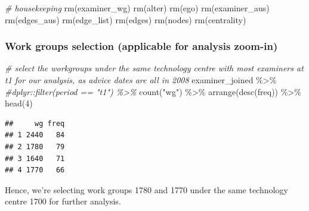 \documentclass[
]{article}
\newenvironment{Shaded}{\begin{snugshade}}{\end{snugshade}}
\newcommand{\CommentTok}[1]{\textcolor[rgb]{0.56,0.35,0.01}{\textit{#1}}}
\newcommand{\DecValTok}[1]{\textcolor[rgb]{0.00,0.00,0.81}{#1}}
\newcommand{\FunctionTok}[1]{\textcolor[rgb]{0.00,0.00,0.00}{#1}}
\newcommand{\NormalTok}[1]{#1}
\newcommand{\OtherTok}[1]{\textcolor[rgb]{0.56,0.35,0.01}{#1}}
\newcommand{\SpecialCharTok}[1]{\textcolor[rgb]{0.00,0.00,0.00}{#1}}
\newcommand{\StringTok}[1]{\textcolor[rgb]{0.31,0.60,0.02}{#1}}
\begin{document}
\begin{Shaded}
\begin{Highlighting}[]
\CommentTok{\# housekeeping}
\FunctionTok{rm}\NormalTok{(examiner\_wg)}
\FunctionTok{rm}\NormalTok{(alter)}
\FunctionTok{rm}\NormalTok{(ego)}
\FunctionTok{rm}\NormalTok{(examiner\_aus)}
\FunctionTok{rm}\NormalTok{(edges\_aus)}
\FunctionTok{rm}\NormalTok{(edge\_list)}
\FunctionTok{rm}\NormalTok{(edges)}
\FunctionTok{rm}\NormalTok{(nodes)}
\FunctionTok{rm}\NormalTok{(centrality)}
\end{Highlighting}
\end{Shaded}

\hypertarget{work-groups-selection-applicable-for-analysis-zoom-in}{%
\subsubsection{Work groups selection (applicable for analysis
zoom-in)}\label{work-groups-selection-applicable-for-analysis-zoom-in}}

\begin{Shaded}
\begin{Highlighting}[]
\CommentTok{\# select the workgroups under the same technology centre with most examiners at t1 for our analysis, as advice dates are all in 2008}
\NormalTok{examiner\_joined }\SpecialCharTok{\%\textgreater{}\%} 
  \CommentTok{\#dplyr::filter(period == "t1") \%\textgreater{}\% }
  \FunctionTok{count}\NormalTok{(}\StringTok{"wg"}\NormalTok{) }\SpecialCharTok{\%\textgreater{}\%} 
  \FunctionTok{arrange}\NormalTok{(}\FunctionTok{desc}\NormalTok{(freq)) }\SpecialCharTok{\%\textgreater{}\%}
  \FunctionTok{head}\NormalTok{(}\DecValTok{4}\NormalTok{)}
\end{Highlighting}
\end{Shaded}

\begin{verbatim}
##     wg freq
## 1 2440   84
## 2 1780   79
## 3 1640   71
## 4 1770   66
\end{verbatim}

Hence, we're selecting work groups 1780 and 1770 under the same
technology centre 1700 for further analysis.

\begin{Shaded}
\end{Shaded}
\end{document}
